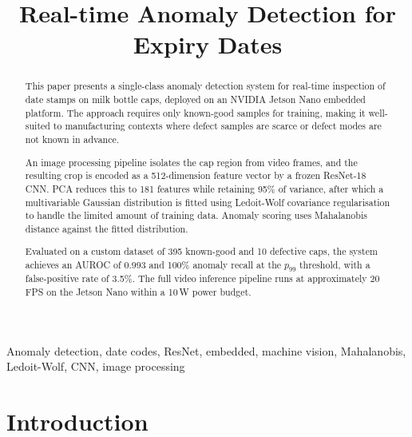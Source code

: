 \documentclass[conference]{IEEEtran}
\begin{document}
\title{Real-time Anomaly Detection for Expiry Dates}

\author{
	\and
}

\maketitle

\begin{abstract}
This paper presents a single-class anomaly detection system for real-time inspection of date stamps on milk bottle caps, deployed on an NVIDIA Jetson Nano embedded platform. The approach requires only known-good samples for training, making it well-suited to manufacturing contexts where defect samples are scarce or defect modes are not known in advance.

An image processing pipeline isolates the cap region from video frames, and the resulting crop is encoded as a 512-dimension feature vector by a frozen ResNet-18 CNN. PCA reduces this to 181 features while retaining 95\% of variance, after which a multivariable Gaussian distribution is fitted using Ledoit-Wolf covariance regularisation to handle the limited amount of training data. Anomaly scoring uses Mahalanobis distance against the fitted distribution.

Evaluated on a custom dataset of 395 known-good and 10 defective caps, the system achieves an AUROC of 0.993 and 100\% anomaly recall at the $p_{99}$ threshold, with a false-positive rate of 3.5\%. The full video inference pipeline runs at approximately 20\,FPS on the Jetson Nano within a 10\,W power budget.
\end{abstract}    

\begin{IEEEkeywords}
Anomaly detection, date codes, ResNet, embedded, machine vision, Mahalanobis, Ledoit-Wolf, CNN, image processing
\end{IEEEkeywords}

\section{Introduction}
\end{document}
